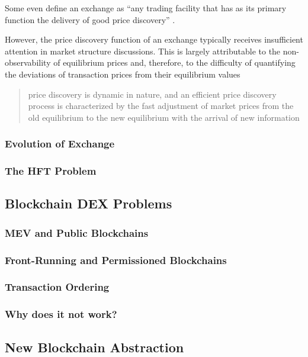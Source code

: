 \documentclass[12pt]{article}
\begin{document}
Some even define an exchange as ``any trading facility that has as its primary function the delivery of good price discovery'' \cite{francioni_schwartz_2017}. 

However, the price discovery function of an  exchange typically receives insufficient attention in market structure discussions. This is largely attributable to the non-observability of equilibrium prices and, therefore, to the difficulty of quantifying the deviations of transaction prices from their equilibrium values \cite{francioni_schwartz_2017}


\begin{quote}
    price discovery is dynamic in nature, and an efficient price discovery process is characterized by the fast adjustment of market prices from the old equilibrium to the new equilibrium with the arrival of new information \cite{RePEc:udb:wpaper:uwec-2005-01-r}    
\end{quote}


\subsubsection*{Evolution of Exchange}
\subsubsection*{The HFT Problem}
\subsection*{Blockchain DEX Problems}
\subsubsection*{MEV and Public Blockchains}
\subsubsection*{Front-Running and Permissioned Blockchains}
\subsubsection*{Transaction Ordering}
\subsubsection*{Why does it not work?}
\subsection*{New Blockchain Abstraction}
\end{document}
